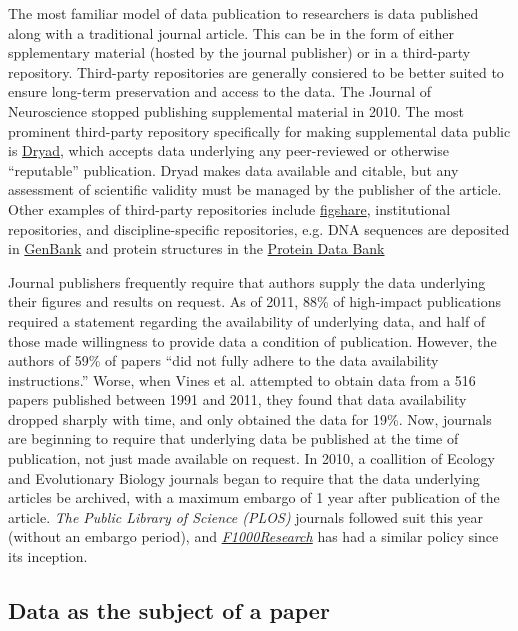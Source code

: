 \documentclass[10pt,twocolumn]{article}
\begin{document}
The most familiar model of data publication to researchers is data published along with a traditional journal article.
This can be in the form of either spplementary material (hosted by the journal publisher) or in a third-party repository.
Third-party repositories are generally consiered to be better suited to ensure long-term preservation and access to the data.
The Journal of Neuroscience stopped publishing supplemental material in 2010.\cite{maunsell_announcement_2010}
The most prominent third-party repository specifically for making supplemental data public is \href{http://www.datadryad.org/}{Dryad}, which accepts data underlying any peer-reviewed or otherwise ``reputable'' publication.
Dryad makes data available and citable, but any assessment of scientific validity must be managed by the publisher of the article.
Other examples of third-party repositories include \href{http://figshare.com/}{figshare}, institutional repositories, and discipline-specific repositories, e.g. DNA sequences are deposited in \href{http://www.ncbi.nlm.nih.gov/genbank/}{GenBank}\cite{benson_genbank_2013} and protein structures in the \href{http://www.rcsb.org/}{Protein Data Bank}\cite{berman_protein_2000}

Journal publishers frequently require that authors supply the data underlying their figures and results on request.
As of 2011, 88\% of high-impact publications required a statement regarding the availability of underlying data, and half of those made willingness to provide data a condition of publication.\cite{alsheikh-ali_public_2011}
However, the authors of 59\% of papers ``did not fully adhere to the data availability instructions.''
Worse, when Vines et al. attempted to obtain data from a 516 papers published between 1991 and 2011, they found that data availability dropped sharply with time, and only obtained the data for 19\%.\cite{vines_availability_2014}
Now, journals are beginning to require that underlying data be published at the time of publication, not just made available on request.
In 2010, a coallition of Ecology and Evolutionary Biology journals began to require that the data underlying articles be archived, with a maximum embargo of 1 year after publication of the article.\cite{whitlock_data_2010, fairbairn_advent_2010}
{\emph{The Public Library of Science (PLOS)}} journals followed suit this year (without an embargo period)\cite{bloom_data_2014}, and \href{http://f1000research.com}{\emph{F1000Research}} has had a similar policy since its inception.

\subsection*{Data as the subject of a paper}\label{paper-subject-data}
\end{document}

